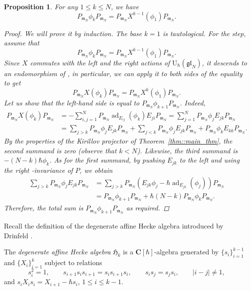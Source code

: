 \documentclass[10pt,a4paper]{amsart}
\numberwithin{equation}{section}
\newtheorem{Proposition}[Theorem]{Proposition}
{ \theoremstyle{definition}
	\newtheorem{Definition}[Theorem]{Definition}
	\newtheorem{Note}[Theorem]{Note}
	\newtheorem{Example}[Theorem]{Example}
	\newtheorem{Remark}[Theorem]{Remark} }
\newcommand{\C}{\mathbf{C}}
\newcommand{\U}{\mathrm{U}_{\hbar}}
\newcommand{\n}{\mathfrak{n}}
\newcommand{\m}{\mathfrak{m}}
\DeclareMathOperator{\ad}{ad}
\newcommand{\res}{\mathrm{res}}
\newcommand{\gl}{\mathfrak{gl}}
\begin{document}
	\begin{Proposition}
		\label{prop:canonical_homomorphism}
		For any $1\leq k \leq N$, we have
		\[
		P_{\m_N} \phi_k P_{\m_N} = P_{\m_N}X^{k-1} (\phi_1) P_{\m_N}.
		\]
		\begin{proof}
			We will prove it by induction. The base $k=1$ is tautological. For the step, assume that
			\[
			P_{\m_N} \phi_k P_{\m_N}= P_{\m_N} X^{k-1} (\phi_1) P_{\m_N}.
			\]
			Since $X$ commutes with the left and the right actions of $\U(\gl_N)$, it descends to an endomorphism of \smash{$\res^{\psi}_{\gl_N}(V \otimes \U(\gl_N))$}, in particular, we can apply it to both sides of the equality to get
			\[
			P_{\m_N} X(\phi_k) P_{\m_N} = P_{\m_N}X^k(\phi_1) P_{\m_N}.
			\]
			Let us show that the left-hand side is equal to $P_{\m_N}\phi_{k+1} P_{\m_N}$. Indeed,
			\begin{align*}
				P_{\m_N}X(\phi_k) P_{\m_N} &= -\sum_{i,j=1}^N P_{\m_N} \ad_{E_{ij}}(\phi_k) E_{ji} P_{\m_N} = \sum_{j=1}^N P_{\m_N} \phi_j E_{jk} P_{\m_N} \\
				&=\sum_{j>k} P_{\m_N} \phi_j E_{jk} P_{\m_N} + \sum_{j <k} P_{\m_N} \phi_j E_{jk} P_{\m_N} + P_{\m_N} \phi_k E_{kk} P_{\m_N}.
			\end{align*}
			By the properties of the Kirillov projector of Theorem~\ref{thm::main_thm}, the second summand is zero (observe that $k<N$). Likewise, the third summand is $-(N-k)\hbar \phi_k$. As for the first summand, by pushing $E_{jk}$ to the left and using the right \smash{$\n_-^{\psi}$}-invariance of $P$, we obtain
			\begin{align*}
			\sum_{j>k} P_{\m_N} \phi_j E_{jk} P_{\m_N} &= \sum_{j>k} P_{\m_N} (E_{jk}\phi_j - \hbar \ad_{E_{jk}}(\phi_j)) P_{\m_N}\\
& = P_{\m_N}\phi_{k+1} P_{\m_N} + \hbar (N-k) P_{\m_N}\phi_k P_{\m_N}.
			\end{align*}
			Therefore, the total sum is $P_{\m_N}\phi_{k+1}P_{\m_N}$ as required.
		\end{proof}
	\end{Proposition}
	
	Recall the definition of the degenerate affine Hecke algebra introduced by Drinfeld \cite{DrinfeldDaH}.
	
	\begin{Definition}
		The \emph{degenerate affine Hecke algebra} $\mathfrak{H}_k$ is a $\C[\hbar]$-algebra generated by $\{s_i\}_{i=1}^{k-1}$ and $\{X_i\}_{i=1}^k$ subject to relations
		\[
		s_i^2 = 1, \qquad s_{i+1} s_i s_{i+1} = s_i s_{i+1} s_i, \qquad s_i s_j = s_j s_i,\qquad |i-j| \neq 1,
		\]
		and
$
		s_i X_i s_i = X_{i+1} - \hbar s_i$, $ 1 \leq i \leq k-1$.
	\end{Definition}
	
\end{document}
